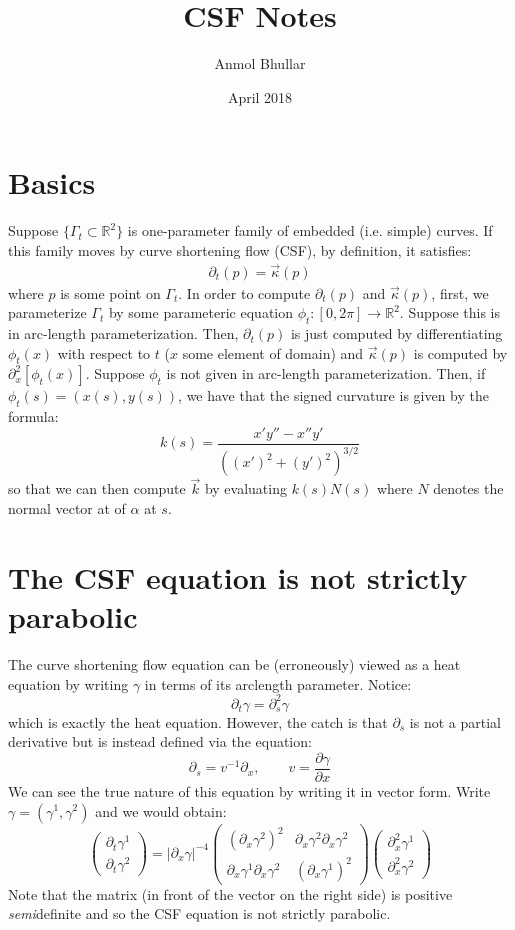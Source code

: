 \documentclass{article}
\title{CSF Notes}
\author{Anmol Bhullar}
\date{April 2018}
\begin{document}
\maketitle

\section{Basics}

Suppose $\{\Gamma_t\subset\mathbb{R}^2\}$ is one-parameter family of embedded (i.e. simple) curves. If
this family moves by curve shortening flow (CSF), by definition, it satisfies:
\begin{align} \tag{1.1}
    \partial_t (p) = \vec{\kappa}(p)
\end{align}
where $p$ is some point on $\Gamma_t$. In order to compute $\partial_t(p)$ and $\vec{\kappa}(p)$, first, we
parameterize $\Gamma_t$ by some parameteric equation $\phi_t:[0,2\pi]\to\mathbb{R}^2$. Suppose this is in
arc-length parameterization. Then, $\partial_t(p)$ is just computed by differentiating $\phi_t(x)$ 
with respect to $t$ ($x$ some element of domain) and $\vec{\kappa}(p)$ is computed by $\partial_x^2[\phi_t(x)]$.
Suppose $\phi_t$ is not given in arc-length parameterization. Then, if $\phi_t(s) = (x(s),y(s))$, we have that the
signed curvature is given by the formula:
\[ k(s) = \frac{x'y''-x''y'}{((x')^2+(y')^2)^{3/2}}\]
so that we can then compute $\vec{k}$ by evaluating $k(s)N(s)$ where $N$ denotes the normal vector at of $\alpha$ at 
$s$.

\section{The CSF equation is not strictly parabolic}

The curve shortening flow equation can be (erroneously) viewed as a heat equation by writing $\gamma$ in terms of its arclength parameter. Notice:
\[ \partial_t \gamma = \partial_s^2 \gamma \]
which is exactly the heat equation. However, the catch is that $\partial_s$ is not a partial derivative but is instead defined via the equation:
\[ \partial_s = v^{-1}\partial_x,\qquad v = \frac{\partial \gamma}{\partial x} \]
We can see the true nature of this equation by writing it in vector form. Write $\gamma = (\gamma^1, \gamma^2)$ and we would obtain:
\[ \begin{pmatrix} \partial_t \gamma^1 \\ \partial_t \gamma^2 \end{pmatrix} = |\partial_x \gamma|^{-4} \begin{pmatrix} (\partial_x \gamma^2)^2 & \partial_x\gamma^2 \partial_x\gamma^2 \\
	\partial_x\gamma^1\partial_x\gamma^2 & (\partial_x\gamma^1)^2 \end{pmatrix} \begin{pmatrix} \partial_x^2 \gamma^1 \\ \partial_x^2 \gamma^2 \end{pmatrix} \]
Note that the matrix (in front of the vector on the right side) is positive \textit{semi}definite and so the CSF equation is not strictly parabolic.
\end{document}
